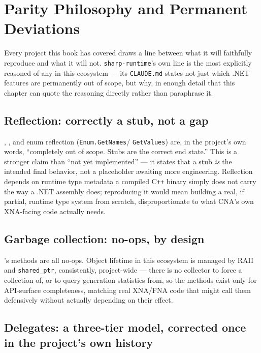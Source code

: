 \chapter{Parity Philosophy and Permanent Deviations}
\label{ch:parity-philosophy}

Every project this book has covered draws a line between what it will faithfully reproduce
and what it will not. \texttt{sharp-runtime}'s own line is the most explicitly reasoned of
any in this ecosystem --- its \texttt{CLAUDE.md} states not just which .NET features are
permanently out of scope, but why, in enough detail that this chapter can quote the reasoning
directly rather than paraphrase it.

\section{Reflection: correctly a stub, not a gap}

, , and enum reflection (\texttt{Enum.GetNames}/%
\texttt{GetValues}) are, in the project's own words, ``completely out of scope. Stubs are the
correct end state.'' This is a stronger claim than ``not yet implemented'' --- it states that
a stub \emph{is} the intended final behavior, not a placeholder awaiting more engineering.
Reflection depends on runtime type metadata a compiled C\texttt{++} binary simply does not
carry the way a .NET assembly does; reproducing it would mean building a real, if partial,
runtime type system from scratch, disproportionate to what CNA's own XNA-facing code actually
needs.

\section{Garbage collection: no-ops, by design}

's methods are all no-ops. Object lifetime in this ecosystem is managed
by RAII and \texttt{shared\_ptr}, consistently, project-wide --- there is no collector to
force a collection of, or to query generation statistics from, so the methods exist only for
API-surface completeness, matching real XNA/FNA code that might call them defensively without
actually depending on their effect.

\section{Delegates: a three-tier model, corrected once in the project's own history}

